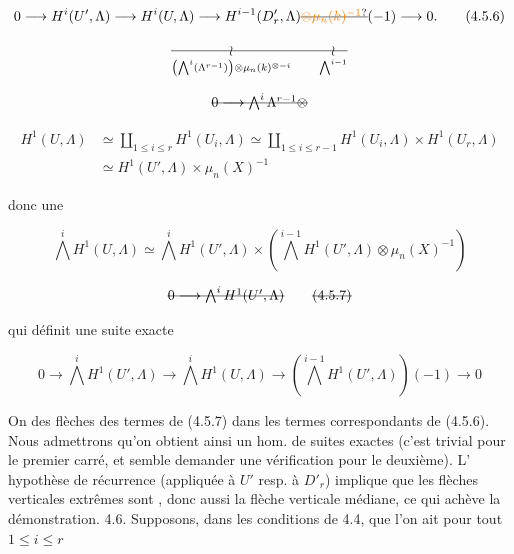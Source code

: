 \[
0\longrightarrow H^i(U',\Lambda)\longrightarrow H^i(U,\Lambda)\longrightarrow H^{i-1}(D'_r,\Lambda)\deleted{\unsure{\otimes\mu_n(k)^{-1}}}(-1)\longrightarrow0.
\tag*{(4.5.6)}
\]

\[
\deleted{\underset{\left(\bigwedge^i(\Lambda^{r-1})\right)\otimes\mu_n(k)^{\otimes-i}}{\wr}\qquad\underset{\bigwedge^{i-1}}{\wr}}
\]


\[
\deleted{0\longrightarrow\bigwedge^i\Lambda^{r-1}\otimes}
\]

\[
\begin{aligned}
H^1(U,\Lambda)&\simeq\coprod_{1\leq i\leq r}H^1(U_i,\Lambda)\simeq\coprod_{1\leq i\leq r-1}H^1(U_i,\Lambda)\times H^1(U_r,\Lambda)\\
&\simeq H^1(U',\Lambda)\times\mu_n(X)^{-1}
\end{aligned}
\]

donc une  

\[
\bigwedge^iH^1(U,\Lambda)\simeq\bigwedge^iH^1(U',\Lambda)\times\left(\bigwedge^{i-1}H^1(U',\Lambda)\otimes\mu_n(X)^{-1}\right)
\]

\[
\deleted{0\longrightarrow\bigwedge^iH^1(U',\Lambda)}
\tag*{\deleted{(4.5.7)}}
\]

 qui définit une suite exacte

\[
0\longrightarrow\bigwedge^iH^1(U',\Lambda)\longrightarrow\bigwedge^iH^1(U,\Lambda)\longrightarrow\left(\bigwedge^{i-1}H^1(U',\Lambda)\right)(-1)\longrightarrow0
\tag*{(4.5.7)}
\]

On    des flèches  des termes de (4.5.7) dans les termes correspondants de (4.5.6). Nous admettrons qu'on obtient ainsi un hom. de suites exactes (c'est trivial pour le premier carré, et semble demander une vérification pour le deuxième). L' hypothèse de récurrence (appliquée à  $U'$ resp. à $D'_r$) implique que les flèches verticales extrêmes sont  , donc aussi la flèche verticale médiane, ce qui achève la démonstration.
4.6. Supposons,  dans les conditions de 4.4, que l'on ait pour tout $1\leq i\leq r$

